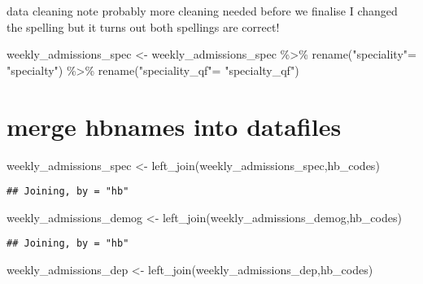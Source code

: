 \documentclass[
]{article}
\newenvironment{Shaded}{\begin{snugshade}}{\end{snugshade}}
\newcommand{\FunctionTok}[1]{\textcolor[rgb]{0.00,0.00,0.00}{#1}}
\newcommand{\NormalTok}[1]{#1}
\newcommand{\OtherTok}[1]{\textcolor[rgb]{0.56,0.35,0.01}{#1}}
\newcommand{\SpecialCharTok}[1]{\textcolor[rgb]{0.00,0.00,0.00}{#1}}
\newcommand{\StringTok}[1]{\textcolor[rgb]{0.31,0.60,0.02}{#1}}
\begin{document}
data cleaning note probably more cleaning needed before we finalise I
changed the spelling but it turns out both spellings are correct!

\begin{Shaded}
\begin{Highlighting}[]
\NormalTok{weekly\_admissions\_spec }\OtherTok{\textless{}{-}}\NormalTok{ weekly\_admissions\_spec }\SpecialCharTok{\%\textgreater{}\%} 
  \FunctionTok{rename}\NormalTok{(}\StringTok{"speciality"}\OtherTok{=} \StringTok{"specialty"}\NormalTok{) }\SpecialCharTok{\%\textgreater{}\%} 
  \FunctionTok{rename}\NormalTok{(}\StringTok{"speciality\_qf"}\OtherTok{=} \StringTok{"specialty\_qf"}\NormalTok{) }
\end{Highlighting}
\end{Shaded}

\hypertarget{merge-hbnames-into-datafiles}{%
\section{merge hbnames into
datafiles}\label{merge-hbnames-into-datafiles}}

\begin{Shaded}
\begin{Highlighting}[]
\NormalTok{weekly\_admissions\_spec }\OtherTok{\textless{}{-}} \FunctionTok{left\_join}\NormalTok{(weekly\_admissions\_spec,hb\_codes)}
\end{Highlighting}
\end{Shaded}

\begin{verbatim}
## Joining, by = "hb"
\end{verbatim}

\begin{Shaded}
\begin{Highlighting}[]
\NormalTok{weekly\_admissions\_demog }\OtherTok{\textless{}{-}} \FunctionTok{left\_join}\NormalTok{(weekly\_admissions\_demog,hb\_codes)}
\end{Highlighting}
\end{Shaded}

\begin{verbatim}
## Joining, by = "hb"
\end{verbatim}

\begin{Shaded}
\begin{Highlighting}[]
\NormalTok{weekly\_admissions\_dep }\OtherTok{\textless{}{-}} \FunctionTok{left\_join}\NormalTok{(weekly\_admissions\_dep,hb\_codes) }
\end{Highlighting}
\end{Shaded}
\end{document}
